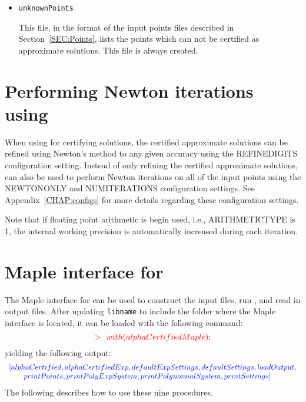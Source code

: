 \documentclass[11pt]{report}
\begin{document}
\begin{itemize}
\item {\tt unknownPoints}

This file, in the format of the input points files described in Section~\ref{SEC:Points},
lists the points which can not be certified as approximate solutions.
This file is always created.

\end{itemize}

\section{Performing Newton iterations using \blueharvest}\label{CHAP:Newton}

When using \blueharvestS for certifying solutions, the certified approximate
solutions can be refined using Newton's method to any given accuracy
using the REFINEDIGITS configuration setting.
Instead of only refining the certified approximate solutions, \blueharvestS
can also be used to perform Newton iterations on all of the input points
using the NEWTONONLY and NUMITERATIONS configuration settings.
See Appendix~\ref{CHAP:configs} for more details regarding
these configuration settings.

Note that if floating point arithmetic is begin used, i.e., ARITHMETICTYPE is 1,
the internal working precision is automatically increased during each iteration.

\section{Maple interface for \blueharvest}\label{CHAP:maple}

The Maple interface for \blueharvestS can be used to construct
the input files, run \blueharvest, and read in output files.
After updating {\tt libname} to include the folder where
the \blueharvestS Maple interface is located, it can be loaded
with the following command:
\[
\begin{color}{red}{\bf >}~~with(alphaCertifiedMaple);\end{color}
\]
yielding the following output:
\[
\begin{color}{blue}
\begin{array}{l}
[alphaCertified, alphaCertifiedExp, defaultExpSettings, defaultSettings, loadOutput, \\
~~~~~~printPoints, printPolyExpSystem, printPolynomialSystem, printSettings]\end{array}\end{color}
\]
The following describes how to use these nine procedures.
\end{document}
